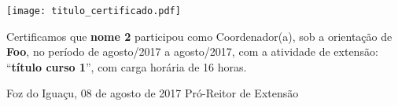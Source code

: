 \documentclass[a4paper,brazil]{article}%
\begin{document}
%
\normalsize%

\pagestyle{empty}
\BgThispage
%
\vspace*{2cm}%
\begin{flushright}%
\texttt{[image: titulo\_certificado.pdf]}%
\linebreak%
\end{flushright}%
\vspace*{-1cm}%
\Large%
%


    Certificamos que \textbf{nome 2} participou como Coordenador(a), sob a orientação de \textbf{Foo}, no período de agosto/2017 a agosto/2017, com a atividade de extensão: ``\textbf{título curso 1}'', com carga horária de 16 horas.

\vspace*{1.5cm}%
\hspace*{7cm}%
\begin{minipage}{\widthof{Foz do Iguaçu, 08 de agosto de 2017}}%
\begin{center}%
Foz do Iguaçu, 08 de agosto de 2017%
\newline%
\newline%
\newline%
Pró{-}Reitor de Extensão%
\end{center}%
\end{minipage}%
\end{document}
